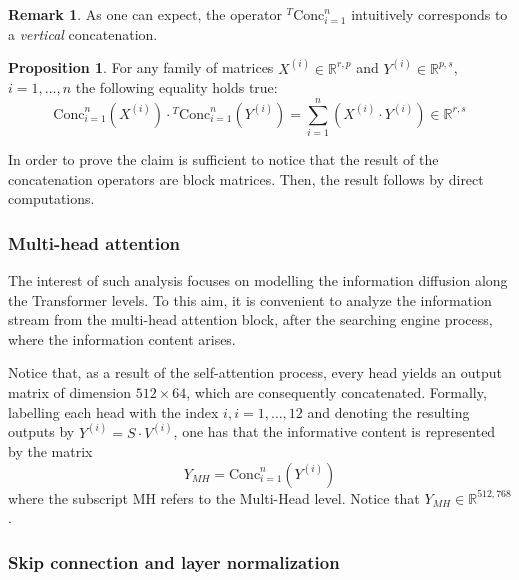 \documentclass[11pt,a4paper,reqno]{amsart} %
\theoremstyle{definition}
\newtheorem{prop}[defn]{Proposition}
\newtheorem{rem}[defn]{Remark}
\numberwithin{equation}{section}          %
\begin{document}
\begin{rem}
As one can expect, the operator ${}^{T}\mathrm{Conc}_{i=1}^n$ intuitively corresponds to a \textit{vertical} concatenation.
\end{rem}

\begin{prop}\label{propimp}
For any family of matrices $X^{(i)} \in \mathbb{R}^{r , p}$ and $Y^{(i)} \in \mathbb{R}^{p , s }$, $i=1, \dots, n$ the following equality holds true:
\begin{equation}
 \mathrm{Conc}_{i=1}^n \left(X^{(i)} \right) \cdot  {}^T\mathrm{Conc}_{i=1}^n \left(Y^{(i)} \right) =\sum_{i=1}^n \left(X^{(i)} \cdot Y^{(i)} \right) \in \mathbb{R}^{r , s}
\end{equation}
\end{prop}

In order to prove the claim is sufficient to notice that the result of the concatenation operators are block matrices. Then, the result follows by direct computations.

\subsubsection{Multi-head attention}

The interest of such analysis focuses on modelling the information diffusion along the Transformer levels. To this aim, it is convenient to analyze the information stream from the multi-head attention block, after the searching engine process, where the information content arises.

Notice that, as a result of the self-attention process, every head yields an output matrix of dimension $512 \times 64$, which are consequently concatenated. Formally, labelling each head with the index $i, i=1, \dots, 12$ and denoting the resulting outputs by 
$Y^{(i)}=S \cdot V^{(i)}$, one has that the informative content is represented by the matrix 
\begin{equation}
Y_{MH}=\mathrm{Conc}_{i=1}^n \left(Y^{(i)} \right)
\end{equation}
where the subscript MH refers to the Multi-Head level. Notice that $Y_{MH} \in \mathbb{R}^{512,768}$.


\subsubsection{Skip connection and layer normalization}
\end{document}
